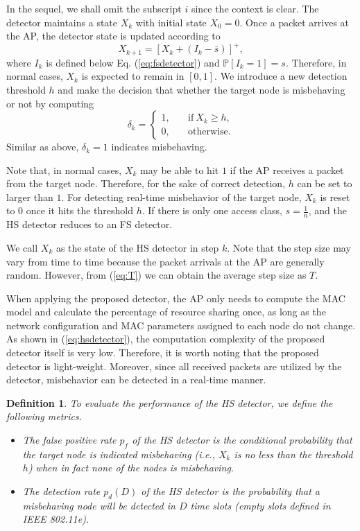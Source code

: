 \documentclass[conference]{IEEEtran}
\newtheorem{definition}{{\bf Definition}}
\begin{document}
In the sequel, we shall omit the subscript $i$ since the context is clear. The detector maintains a state $X_k$ with initial state $X_0=0$. Once a packet arrives at the AP, the detector state is updated according to
\begin{equation}\label{eq:hsdetector}
    X_{k+1} = \left[X_k+(I_k-\bar{s})\right]^+,
\end{equation}
where $I_k$ is defined below Eq. (\ref{eq:fsdetector}) and $\mathbb{P}[I_k=1] = s$. Therefore, in normal cases, $X_k$ is expected to remain in $[0,1]$. We introduce a new detection threshold $h$ and make the decision that whether the target node is misbehaving or not by computing
\begin{equation}
    \delta_k = \left\{\begin{array}{ll}
        1, \quad & \textrm{if}~X_k \geq h,\\
        0, \quad & \textrm{otherwise}.
    \end{array}\right.
\end{equation}
Similar as above, $\delta_k=1$ indicates misbehaving.

Note that, in normal cases, $X_k$ may be able to hit $1$ if the AP receives a packet from the target node. Therefore, for the sake of correct detection, $h$ can be set to larger than $1$. For detecting real-time misbehavior of the target node, $X_k$ is reset to $0$ once it hits the threshold $h$. If there is only one access class, $s=\frac1n$, and the HS detector reduces to an FS detector.

We call $X_k$ as the state of the HS detector in step $k$. Note that the step size may vary from time to time because the packet arrivals at the AP are generally random. However, from (\ref{eq:T}) we can obtain the average step size as $T$.

When applying the proposed detector, the AP only needs to compute the MAC model and calculate the percentage of resource sharing once, as long as the network configuration and MAC parameters assigned to each node do not change. As shown in (\ref{eq:hsdetector}), the computation complexity of the proposed detector itself is very low. Therefore, it is worth noting that the proposed detector is light-weight. Moreover, since all received packets are utilized by the detector, misbehavior can be detected in a real-time manner.

\begin{definition}\label{def:falseposrate}
To evaluate the performance of the HS detector, we define the following metrics.
\begin{itemize}
\item The \emph{false positive rate} $p_f$ of the HS detector is the conditional probability that the target node is indicated misbehaving (i.e., $X_k$ is no less than the threshold $h$) when in fact none of the nodes is misbehaving.
\item The \emph{detection rate} $p_d(D)$ of the HS detector is the probability that a misbehaving node will be detected in $D$ time slots (empty slots defined in IEEE 802.11e).
\end{itemize}
\end{definition}
\end{document}
